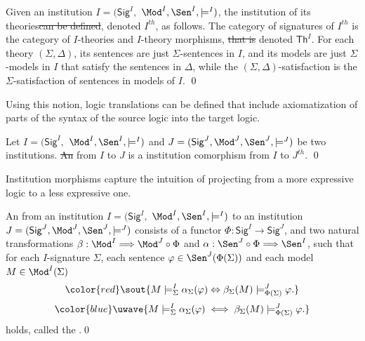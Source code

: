 \documentclass[10pt,fleqn,final]{scrreprt}
\newcommand{\Sig}{\mathsf{Sig}}
\renewcommand{\Th}{\mathsf{Th}}
\newenvironment{definitions}[0]{\medskip }{}
\providecommand{\DIFadd}[1]{{\protect\color{blue}\uwave{#1}}} %
\providecommand{\DIFdel}[1]{{\protect\color{red}\sout{#1}}}                      %
\providecommand{\DIFaddbegin}{} %
\providecommand{\DIFaddend}{} %
\providecommand{\DIFdelbegin}{} %
\providecommand{\DIFdelend}{} %
\begin{document}
\begin{definitions}
\begin{definition}
  Given an institution  $I = (\Sig^I,$ $ \Mod^I, \Sen^I, \models^I)$, the
   institution of its theories\DIFdelbegin \DIFdel{can be defined}\DIFdelend , denoted $I^{th}$, \DIFaddbegin \DIFadd{can be defined }\DIFaddend as follows. The category of signatures of $I^{th}$ is the category
   of $I$-theories and $I$-theory morphisms, \DIFdelbegin \DIFdel{that  is }\DIFdelend denoted $\Th^I$.
   For each theory $(\Sigma, \Delta)$, its sentences are just $\Sigma$-sentences in $I$, and
   its models are just $\Sigma$-models in $I$ that satisfy the sentences in $\Delta$, while the
   $(\Sigma,\Delta)$-satisfaction is the $\Sigma$-satisfaction of sentences in models of $I$.
\qed \end{definition}

Using this notion, logic translations can be defined that include axiomatization of parts of the
syntax of the source logic into the target logic.

\begin{definition}

 Let $I = (\Sig^I,$ $ \Mod^I, \Sen^I, \models^I)$ and $J = (\Sig^J, \Mod^J,
\Sen^J, \models^J)$ be two institutions. \DIFdelbegin \DIFdel{An }\DIFdelend \DIFaddbegin \DIFadd{A }\DIFaddend {} from $I$ to
$J$ is a institution comorphism from $I$ to $J^{th}$.
\qed\end{definition}

\medskip

Institution morphisms capture the intuition of projecting from a more expressive logic to a less expressive one.

\begin{definition} 
An  from an institution $I = (\Sig^I,$ $ \Mod^I, \Sen^I, \models^I)$ to
an institution $J = (\Sig^J, \Mod^J,
\Sen^J, \models^J)$ consists of a functor $\Phi : \Sig^I \longrightarrow \Sig^J$, and two
natural transformations \DIFdelbegin \DIFdel{$\beta: \Mod^I \Longrightarrow \Mod^J \circ \Phi$
}\DIFdelend \DIFaddbegin \DIFadd{$\beta: \Mod^I \Longrightarrow \Mod^J \circ \Phi^{op}$
}\DIFaddend and $\alpha:  \Sen^J \circ \Phi \Longrightarrow \Sen^I $, such that for each $I$-signature $\Sigma$, each sentence $\varphi\in\Sen^J(\Phi(\Sigma))$ and each model $M\in\Mod^I(\Sigma)$
\DIFdelbegin \begin{displaymath}\DIFdel{ M\models^{I}_{\Sigma}\alpha_{\Sigma}(\varphi) \Leftrightarrow
\beta_{\Sigma}(M)\models^J_{\Phi(\Sigma)}\varphi.
}\end{displaymath}
\DIFdelend %
\DIFaddbegin \begin{equation*}\DIFadd{
  M\models^{I}_{\Sigma}\alpha_{\Sigma}(\varphi)
\iff
  \beta_{\Sigma}(M)\models^J_{\Phi(\Sigma)}\varphi.
}\end{equation*}
\DIFaddend holds, called the .\DIFaddbegin \quad\DIFaddend \qed
\end{definition}


\end{definitions}
\end{document}
